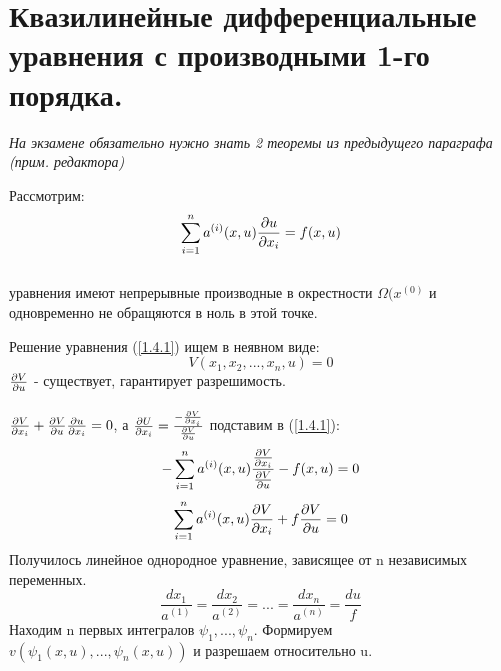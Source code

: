 \documentclass[../main.tex]{subfiles}
\begin{document}
\section{Квазилинейные дифференциальные уравнения с производными 1-го порядка.}


\textit{На экзамене обязательно нужно знать 2 теоремы из предыдущего параграфа (прим. редактора)}


\par Рассмотрим:
\begin{equation}\label{1.4.1}
	\sum_{i=1}^{n}a^{(i)}(x,u)\frac{\partial u}{\partial x_i}=f(x,u)
\end{equation}
\\ уравнения имеют непрерывные производные в окрестности $\Omega(x^{(0)}$ и одновременно не обращяются в ноль в этой точке.\\

\par Решение уравнения (\ref{1.4.1}) ищем в неявном виде:
$$V(x_1,x_2,...,x_n,u)=0$$
$\frac{\partial V}{\partial u}$ - существует, гарантирует разрешимость.
\\ \\
$\frac{\partial V}{\partial x_i}+\frac{\partial V}{\partial u}\frac{\partial u}{\partial x_i} = 0$, а $\frac{\partial U}{\partial x_i} = \frac{-\frac{\partial V}{\partial x_i}}{\frac{\partial V}{\partial u}}$ подставим в (\ref{1.4.1}):\\

$$-\sum_{i=1}^{n}a^{(i)}(x,u)\frac{\frac{\partial V}{\partial x_i}}{\frac{\partial V}{\partial u}}-f(x,u)=0$$
$$\sum_{i=1}^{n}a^{(i)}(x,u)\frac{\partial V}{\partial x_i}+f\frac{\partial V}{\partial u} = 0$$
Получилось линейное однородное уравнение, зависящее от n независимых переменных.
$$\frac{dx_1}{a^{(1)}}=\frac{dx_2}{a^{(2)}}=...=\frac{dx_n}{a^{(n)}}=\frac{du}{f}$$
Находим n первых интегралов $\psi_1,...,\psi_n$. Формируем $v(\psi_1(x,u),...,\psi_n(x,u))$ и разрешаем относительно u.
\end{document}
